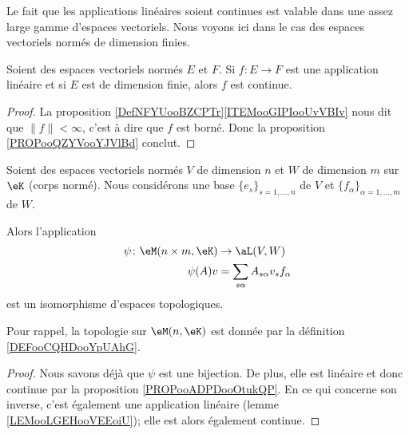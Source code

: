 Le fait que les applications linéaires soient continues est valable dans une assez large gamme d'espaces vectoriels\cite{BIBooUWMLooWEPxcC}. Nous voyons ici dans le cas des espaces vectoriels normés de dimension finies.
\begin{proposition}     \label{PROPooADPDooOtukQP}
    Soient des espaces vectoriels normés \( E\) et \( F\). Si \( f\colon E\to F\) est une application linéaire et si \( E\) est de dimension finie, alors \( f\) est continue.
\end{proposition}

\begin{proof}
    La proposition \ref{DefNFYUooBZCPTr}\ref{ITEMooGIPIooUvVBIv} nous dit que \( \| f \|<\infty\), c'est à dire que \( f\) est borné. Donc la proposition \ref{PROPooQZYVooYJVlBd} conclut.
\end{proof}

\begin{proposition}     \label{PROPooXEQLooHvzVVm}
    Soient des espaces vectoriels normés \( V\) de dimension \( n\) et \( W\) de dimension \( m\) sur \( \eK\) (corps normé). Nous considérons une base \( \{ e_s \}_{s=1,\ldots, n}\) de \( V\) et \( \{ f_{\alpha} \}_{\alpha=1,\ldots, m}\) de \( W\).

    Alors l'application
    \begin{equation}
        \begin{aligned}
            \psi\colon \eM(n\times m,\eK)  &\to \aL(V,W) \\
            \psi(A)v&=\sum_{s\alpha}A_{s\alpha}v_sf_{\alpha}
        \end{aligned}
    \end{equation}
    est un isomorphisme d'espaces topologiques.

    Pour rappel, la topologie sur \( \eM(n,\eK)\) est donnée par la définition \ref{DEFooCQHDooYpUAhG}.
\end{proposition}

\begin{proof}
    Nous savons déjà que \( \psi\) est une bijection. De plus, elle est linéaire et donc continue par la proposition \ref{PROPooADPDooOtukQP}. En ce qui concerne son inverse, c'est également une application linéaire (lemme \ref{LEMooLGEHooVEEoiU}); elle est alors également continue.
\end{proof}


